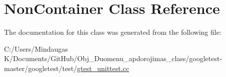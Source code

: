 \hypertarget{class_non_container}{}\section{Non\+Container Class Reference}
\label{class_non_container}


The documentation for this class was generated from the following file\+:\begin{DoxyCompactItemize}
\item 
C\+:/\+Users/\+Mindaugas K/\+Documents/\+Git\+Hub/\+Obj\+\_\+\+Duomenu\+\_\+apdorojimas\+\_\+class/googletest-\/master/googletest/test/\mbox{\hyperlink{googletest-master_2googletest_2test_2gtest__unittest_8cc}{gtest\+\_\+unittest.\+cc}}\end{DoxyCompactItemize}

